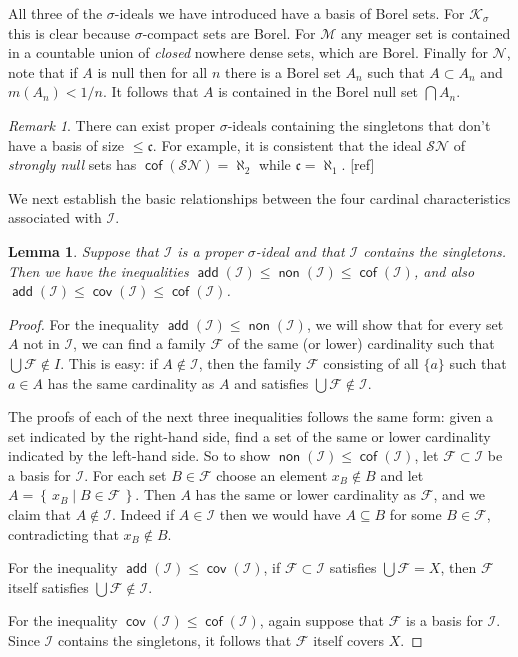 \documentclass[11pt,oneside]{amsbook}
\newcommand{\set}[1]{\left\{\,#1\,\right\}}
\newcommand{\Null}{\mathcal N}
\newcommand{\Meager}{\mathcal M}
\newcommand{\Ksigma}{\mathcal K_\sigma}
\DeclareMathOperator{\add}{\mathsf{add}}
\DeclareMathOperator{\non}{\mathsf{non}}
\DeclareMathOperator{\cov}{\mathsf{cov}}
\DeclareMathOperator{\cof}{\mathsf{cof}}
\theoremstyle{definition}
\theoremstyle{plain}
\newtheorem{lem}[thm]{Lemma}
\theoremstyle{definition}
\theoremstyle{remark}
\newtheorem{rem}[thm]{Remark}
\numberwithin{equation}{section}
\numberwithin{figure}{section}
\begin{document}
All three of the $\sigma$-ideals we have introduced have a basis of Borel sets. For $\Ksigma$ this is clear because $\sigma$-compact sets are Borel. For $\Meager$ any meager set is contained in a countable union of \emph{closed} nowhere dense sets, which are Borel. Finally for $\Null$, note that if $A$ is null then for all $n$ there is a Borel set $A_n$ such that $A\subset A_n$ and $m(A_n)<1/n$. It follows that $A$ is contained in the Borel null set $\bigcap A_n$.

\begin{rem}
  There can exist proper $\sigma$-ideals containing the singletons that don't have a basis of size $\leq\mathfrak c$. For example, it is consistent that the ideal $\mathcal{SN}$ of \emph{strongly null} sets has $\cof(\mathcal{SN})=\aleph_2$ while $\mathfrak c=\aleph_1$. [ref] %
\end{rem}

We next establish the basic relationships between the four cardinal characteristics associated with $\mathcal I$.

\begin{lem}
  \label{lem:diamond}
  Suppose that $\mathcal I$ is a proper $\sigma$-ideal and that $\mathcal I$ contains the singletons. Then we have the inequalities $\add(\mathcal I)\leq\non(\mathcal I)\leq\cof(\mathcal I)$, and also $\add(\mathcal I)\leq\cov(\mathcal I)\leq\cof(\mathcal I)$.
\end{lem}

\begin{proof}
  For the inequality $\add(\mathcal{I})\leq\non(\mathcal{I})$, we will show that for every set $A$ not in $\mathcal I$, we can find a family $\mathcal F$ of the same (or lower) cardinality such that $\bigcup\mathcal F\notin I$. This is easy: if $A\notin\mathcal I$, then the family $\mathcal F$ consisting of all $\{a\}$ such that $a\in A$ has the same cardinality as $A$ and satisfies $\bigcup\mathcal F\notin\mathcal I$.

  The proofs of each of the next three inequalities follows the same form: given a set indicated by the right-hand side, find a set of the same or lower cardinality indicated by the left-hand side. So to show $\non(\mathcal I)\leq\cof(\mathcal I)$, let $\mathcal F\subset \mathcal{I}$ be a basis for $\mathcal I$. For each set $B\in\mathcal F$ choose an element $x_B\notin B$ and let $A=\set{x_B\mid B\in\mathcal F}$. Then $A$ has the same or lower cardinality as $\mathcal F$, and we claim that $A\notin\mathcal{I}$. Indeed if $A\in\mathcal{I}$ then we would have $A\subseteq B$ for some $B\in\mathcal F$, contradicting that $x_B\notin B$.

  For the inequality $\add(\mathcal I)\leq\cov(\mathcal I)$, if $\mathcal F\subset\mathcal{I}$ satisfies $\bigcup\mathcal F=X$, then $\mathcal F$ itself satisfies $\bigcup\mathcal F\notin\mathcal I$.

  For the inequality $\cov(\mathcal I)\leq\cof(\mathcal I)$, again suppose that $\mathcal F$ is a basis for $\mathcal I$. Since $\mathcal I$ contains the singletons, it follows that $\mathcal F$ itself covers $X$.
\end{proof}
\end{document}
